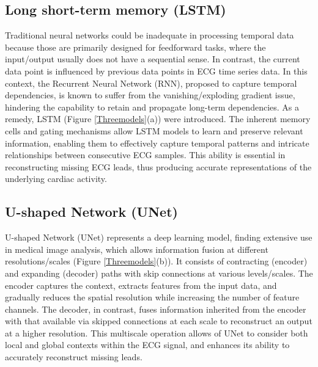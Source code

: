 \documentclass[conference]{IEEEtran}
\begin{document}
 


\subsection{Long short-term memory (LSTM)}

Traditional neural networks could be inadequate in processing temporal data because those are primarily designed for feedforward tasks, where the input/output usually does not have a sequential sense. In contrast, the current data point is influenced by previous data points in ECG time series data. In this context, the Recurrent Neural Network (RNN), proposed to capture temporal dependencies, is known to suffer from the vanishing/exploding gradient issue, hindering the capability to retain and propagate long-term dependencies. As a remedy, LSTM (Figure \ref{Threemodels}(a)) were introduced. The inherent memory cells and gating mechanisms allow LSTM models to learn and preserve relevant information, enabling them to effectively capture temporal patterns and intricate relationships between consecutive ECG samples. This ability is essential in reconstructing missing ECG leads, thus producing accurate representations of the underlying cardiac activity. 





\subsection{U-shaped Network (UNet)}

U-shaped Network (UNet) represents a deep learning model,
finding extensive use in medical image analysis, which allows information fusion at different resolutions/scales (Figure \ref{Threemodels}(b)). It consists of contracting (encoder) and expanding (decoder) paths with skip connections at various levels/scales. The encoder captures the context, extracts features from the input data, and gradually reduces the spatial resolution while increasing the number of feature channels. The decoder, in contrast, fuses information inherited from the encoder with that available via skipped connections at each scale to reconstruct an output at a higher resolution. This multiscale operation allows of UNet to consider both local and global contexts within the ECG signal, and enhances its ability to accurately reconstruct missing leads.  
\end{document}
